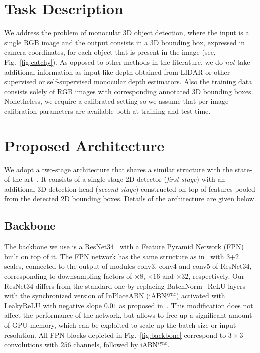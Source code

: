 \documentclass[10pt,twocolumn,letterpaper]{article}
\newcommand{\iABNsync}{iABN$^\text{sync}$\xspace}
\newcommand{\convx}[1]{\textrm{conv#1}}
\begin{document}
\section{Task Description}

We address the problem of monocular 3D object detection, where the input is a single RGB image and the output consists in a 3D bounding box, expressed in camera coordinates, for each object that is present in the image (see, Fig.~\ref{fig:catchy}).
As opposed to other methods in the literature, we do \emph{not} take additional information as input like depth obtained from LIDAR or other supervised or self-supervised monocular depth estimators. Also the training data consists solely of RGB images with corresponding annotated 3D bounding boxes. Nonetheless, we require a calibrated setting so we assume that per-image calibration parameters are available both at training and test time.


\section{Proposed Architecture}

We adopt a two-stage architecture that shares a similar structure with the state-of-the-art~\cite{Manhardt_2019_CVPR}. It consists of a single-stage 2D detector (\emph{first stage}) with an additional 3D detection head (\emph{second stage}) constructed on top of features pooled from the detected 2D bounding boxes. Details of the architecture are given below.

\subsection{Backbone}
The backbone we use is a ResNet34~\cite{He2015b} with a Feature Pyramid Network (FPN)~\cite{Lin2016} built on top of it. The FPN network has the same structure as in~\cite{Lin+17} with 3+2 scales, connected to the output of modules \convx3, \convx4 and \convx5 of ResNet34, corresponding to downsampling factors of $\times 8$, $\times 16$ and $\times 32$, respectively. Our ResNet34 differs from the standard one by replacing BatchNorm+ReLU layers with the synchronized version of InPlaceABN (\iABNsync) activated with LeakyReLU with negative slope $0.01$ as proposed in~\cite{RotPorKon18a}. This modification does not affect the performance of the network, but allows to free up a significant amount of GPU memory, which can be exploited to scale up the batch size or input resolution. All FPN blocks depicted in Fig.~\ref{fig:backbone} correspond to $3\times 3$ convolutions with $256$ channels, followed by \iABNsync.
\end{document}
